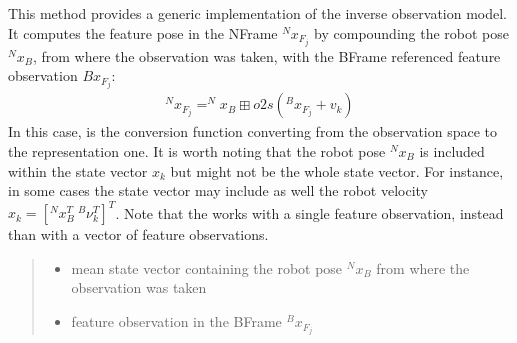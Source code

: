\documentclass[letterpaper,10pt,english]{sphinxmanual}
\begin{document}
\begin{fulllineitems}
\begin{fulllineitems}
\end{fulllineitems}


\begin{fulllineitems}
\label{\detokenize{FEKFMBLocalization:MapFeature.MapFeature.g}}
\pysigstartsignatures
{}
\pysigstopsignatures
\sphinxAtStartPar
This method provides a generic implementation of the inverse observation model. It computes the feature pose in the N\sphinxhyphen{}Frame \(^Nx_{F_j}\) by compounding the robot pose \(^Nx_B\), from where the observation was taken, with the  B\sphinxhyphen{}Frame referenced feature
observation \(Bx_{F_j}\):
\begin{equation}\label{equation:FEKFMBLocalization:eq-g}
\begin{split}^Nx_{F_j} = ^Nx_B \boxplus o2s(^Bx_{F_j} +v_k)\end{split}
\end{equation}
\sphinxAtStartPar
In this case, {\hyperref[\detokenize{FEKFMBLocalization:MapFeature.MapFeature.o2s}]{}} is the conversion function converting from the observation space to the representation one.
It is worth noting that the robot pose \(^Nx_B\) is included within the state vector \(x_k\) but might not be the whole state vector.
For instance, in some cases the state vector may include as well the robot velocity \(x_k=[^Nx_B^T~^B\nu_k^T]^T\).
Note that the {\hyperref[\detokenize{FEKFMBLocalization:MapFeature.MapFeature.g}]{}} works with a single feature observation, instead than with a vector of feature observations.
\begin{quote}\begin{description}
\begin{itemize}
\item {} 
\sphinxAtStartPar
{} \textendash{} mean state vector containing the robot pose \(^Nx_B\) from where the observation was taken

\item {} 
\sphinxAtStartPar
{} \textendash{} feature observation in the B\sphinxhyphen{}Frame \(^Bx_{F_j}\)


\end{itemize}
\end{description}
\end{quote}
\end{fulllineitems}
\end{fulllineitems}
\end{document}
